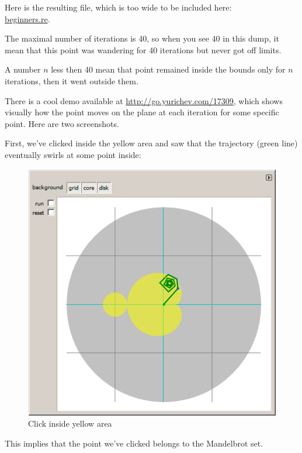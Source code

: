 

Here is the resulting file, 
which is too wide to be included here: \\
\href{http://go.yurichev.com/17164}{beginners.re}.


The maximal number of iterations is 40, so when you see 40 in this dump, it mean that this point was wandering
for 40 iterations but never got off limits. 

A number $n$ less then 40 mean that point remained inside the bounds only for $n$ iterations, 
then it went outside them.

\clearpage
There is a cool demo available at 
\url{http://go.yurichev.com/17309}, which shows
visually how the point moves on the plane at each iteration for some specific point. 
Here are two screenshots.

%
First, we've clicked inside the yellow area and saw that the trajectory (green line)
eventually swirls at some point inside:

\begin{figure}[H]
\centering
\includegraphics[scale=\FigScale]{examples/demos/mandelbrot/demo1.png}
\caption{Click inside yellow area}
\end{figure}


This implies that the point we've clicked belongs to the Mandelbrot set.

\clearpage

